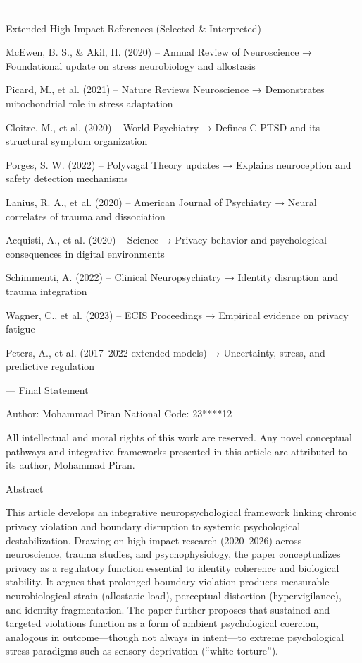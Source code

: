 ---

Extended High-Impact References (Selected & Interpreted)

McEwen, B. S., & Akil, H. (2020) – Annual Review of Neuroscience
→ Foundational update on stress neurobiology and allostasis

Picard, M., et al. (2021) – Nature Reviews Neuroscience
→ Demonstrates mitochondrial role in stress adaptation

Cloitre, M., et al. (2020) – World Psychiatry
→ Defines C-PTSD and its structural symptom organization

Porges, S. W. (2022) – Polyvagal Theory updates
→ Explains neuroception and safety detection mechanisms

Lanius, R. A., et al. (2020) – American Journal of Psychiatry
→ Neural correlates of trauma and dissociation

Acquisti, A., et al. (2020) – Science
→ Privacy behavior and psychological consequences in digital environments

Schimmenti, A. (2022) – Clinical Neuropsychiatry
→ Identity disruption and trauma integration

Wagner, C., et al. (2023) – ECIS Proceedings
→ Empirical evidence on privacy fatigue

Peters, A., et al. (2017–2022 extended models)
→ Uncertainty, stress, and predictive regulation

---
Final Statement

Author: Mohammad Piran
National Code: 23****12

All intellectual and moral rights of this work are reserved. Any novel conceptual pathways and integrative frameworks presented in this article are attributed to its author, Mohammad Piran.

Abstract

This article develops an integrative neuropsychological framework linking chronic privacy violation and boundary disruption to systemic psychological destabilization. Drawing on high-impact research (2020–2026) across neuroscience, trauma studies, and psychophysiology, the paper conceptualizes privacy as a regulatory function essential to identity coherence and biological stability. It argues that prolonged boundary violation produces measurable neurobiological strain (allostatic load), perceptual distortion (hypervigilance), and identity fragmentation. The paper further proposes that sustained and targeted violations function as a form of ambient psychological coercion, analogous in outcome—though not always in intent—to extreme psychological stress paradigms such as sensory deprivation (“white torture”).


